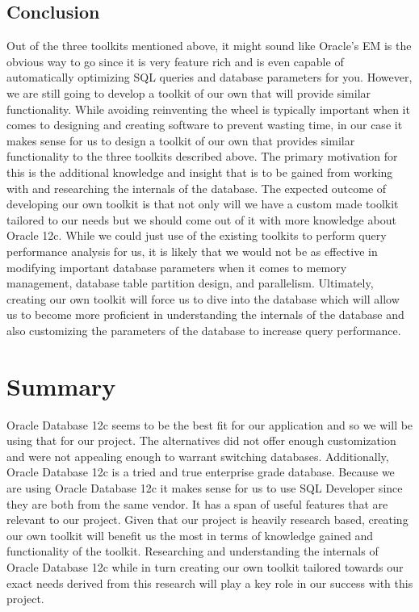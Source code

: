 \documentclass[draftclsnofoot, onecolumn, compsoc, 10pt]{IEEEtran}
\begin{document}
\subsection{Conclusion}
Out of the three toolkits mentioned above, it might sound like Oracle’s EM is the obvious way to go since it is very feature rich and is even capable of automatically optimizing SQL queries and database parameters for you. 
However, we are still going to develop a toolkit of our own that will provide similar functionality. 
While avoiding reinventing the wheel is typically important when it comes to designing and creating software to prevent wasting time, in our case it makes sense for us to design a toolkit of our own that provides similar functionality to the three toolkits described above. 
The primary motivation for this is the additional knowledge and insight that is to be gained from working with and researching the internals of the database.
The expected outcome of developing our own toolkit is that not only will we have a custom made toolkit tailored to our needs but we should come out of it with more knowledge about Oracle 12c. 
While we could just use of the existing toolkits to perform query performance analysis for us, it is likely that we would not be as effective in modifying important database parameters when it comes to memory management, database table partition design, and parallelism. 
Ultimately, creating our own toolkit will force us to dive into the database which will allow us to become more proficient in understanding the internals of the database and also customizing the parameters of the database to increase query performance.

\section{Summary}
Oracle Database 12c seems to be the best fit for our application and so we will be using that for our project. The alternatives did not offer enough customization and were not appealing enough to warrant switching databases. Additionally, Oracle Database 12c is a tried and true enterprise grade database.
Because we are using Oracle Database 12c it makes sense for us to use SQL Developer since they are both from the same vendor. It has a span of useful features that are relevant to our project.
Given that our project is heavily research based, creating our own toolkit will benefit us the most in terms of knowledge gained and functionality of the toolkit. 
Researching and understanding the internals of Oracle Database 12c while in turn creating our own toolkit tailored towards our exact needs derived from this research will play a key role in our success with this project.
\end{document}
